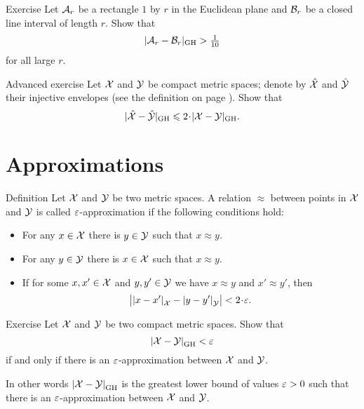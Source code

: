 \begin{thm}{Exercise}\label{ex:rectangle}
Let $\mathcal{A}_r$ be a rectangle $1$ by $r$ in the Euclidean plane 
and $\mathcal{B}_r$ be a closed line interval of length $r$.
Show that 
\[|\mathcal{A}_r-\mathcal{B}_r|_{\operatorname{\rm GH}\nolimits}>\tfrac1{10}\]
for all large $r$.
\end{thm}

\begin{thm}{Advanced exercise}\label{ex:GH-inj}
Let $\mathcal{X}$ and $\mathcal{Y}$ be compact metric spaces;
denote by $\hat{\mathcal{X}}$ and $\hat{\mathcal{Y}}$ their injective envelopes (see the definition on page \pageref{page:InjX}).
Show that 
\[|\hat{\spc{X}}-\hat{\spc{Y}}|_{\GH}\le 2\cdot|\spc{X}- \spc{Y}|_{\GH}.\] 

\end{thm}

\section{Approximations}\label{sec:GH-approx}

\begin{thm}{Definition}\label{ex:defGHR}
Let $\mathcal{X}$ and $\mathcal{Y}$ be two metric spaces.
A relation $\approx$ between points in $\mathcal{X}$ and $\mathcal{Y}$ is called $\varepsilon$-approximation if the following conditions hold:
\begin{itemize}
\item For any $x\in  \mathcal{X}$ there is $y\in \mathcal{Y}$ such that $x\approx y$.
\item For any $y\in  \mathcal{Y}$ there is $x\in \mathcal{X}$ such that $x\approx y$.
\item If for some $x, x'\in  \mathcal{X}$ and $y,y'\in \mathcal{Y}$ we have $x\approx y$ and $x'\approx y'$, then 
\[\bigl|\dist{x}{x'}{\spc{X}}-\dist{y}{y'}{\spc{Y}}\bigr|<2\cdot\eps.\]
\end{itemize}

\end{thm}

\begin{thm}{Exercise}\label{ex:H-R}
Let $\mathcal{X}$ and $\mathcal{Y}$ be two compact metric spaces.
Show that
\[\dist{\spc{X}}{\spc{Y}}{\GH}<\eps\]
if and only if there is an $\varepsilon$-approximation between $\mathcal{X}$ and $\mathcal{Y}$.

In other words $\dist{\spc{X}}{\spc{Y}}{\GH}$ is the greatest lower bound of values $\varepsilon>0$ such that  there is an $\varepsilon$-approximation between $\mathcal{X}$ and $\mathcal{Y}$.
\end{thm}


